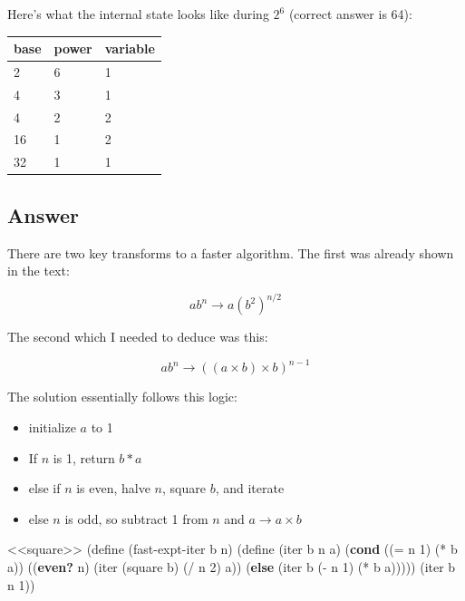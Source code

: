 \documentclass[
]{article}
\newenvironment{Shaded}{}{}
\newcommand{\DecValTok}[1]{\textcolor[rgb]{0.25,0.63,0.44}{#1}}
\newcommand{\ExtensionTok}[1]{#1}
\newcommand{\FunctionTok}[1]{\textcolor[rgb]{0.02,0.16,0.49}{#1}}
\newcommand{\KeywordTok}[1]{\textcolor[rgb]{0.00,0.44,0.13}{\textbf{#1}}}
\newcommand{\NormalTok}[1]{#1}
\newcommand{\OperatorTok}[1]{\textcolor[rgb]{0.40,0.40,0.40}{#1}}
\providecommand{\tightlist}{%
  \setlength{\itemsep}{0pt}\setlength{\parskip}{0pt}}
\begin{document}
Here's what the internal state looks like during \(2^6\) (correct answer
is 64):

\begin{longtable}[]{@{}lll@{}}
\toprule
base & power & variable \\
\midrule
\endhead
2 & 6 & 1 \\
4 & 3 & 1 \\
4 & 2 & 2 \\
16 & 1 & 2 \\
32 & 1 & 1 \\
\bottomrule
\end{longtable}

\hypertarget{answer-14}{%
\subsection{Answer}\label{answer-14}}

There are two key transforms to a faster algorithm. The first was
already shown in the text:

\[
    ab^n \to a(b^2)^{n/2}
\]

The second which I needed to deduce was this:

\[
    ab^n \to ((a \times b) \times b)^{n - 1}
\]

The solution essentially follows this logic:

\begin{itemize}
\tightlist
\item
  initialize \(a\) to 1
\item
  If \( n \) is 1, return \(b * a\)
\item
  else if \(n\) is even, halve \(n\), square \(b\), and iterate
\item
  else \(n\) is odd, so subtract 1 from \(n\) and \(a \to a \times b\)
\end{itemize}

\hypertarget{fast-expt-iter}{%
\label{fast-expt-iter}}%
\begin{Shaded}
\begin{Highlighting}[numbers=left,,]
\NormalTok{\textless{}\textless{}square\textgreater{}\textgreater{}}
\NormalTok{(}\ExtensionTok{define}\FunctionTok{ }\NormalTok{(fast{-}expt{-}iter b n)}
\NormalTok{  (}\ExtensionTok{define}\FunctionTok{ }\NormalTok{(iter b n a)}
\NormalTok{    (}\KeywordTok{cond}\NormalTok{ ((}\OperatorTok{=}\NormalTok{ n }\DecValTok{1}\NormalTok{) (}\OperatorTok{*}\NormalTok{ b a))}
\NormalTok{          ((}\KeywordTok{even?}\NormalTok{ n) (iter (square b)}
\NormalTok{                         (}\OperatorTok{/}\NormalTok{ n }\DecValTok{2}\NormalTok{)}
\NormalTok{                         a))}
\NormalTok{          (}\KeywordTok{else}\NormalTok{ (iter b (}\OperatorTok{{-}}\NormalTok{ n }\DecValTok{1}\NormalTok{) (}\OperatorTok{*}\NormalTok{ b a)))))}
\NormalTok{  (iter b n }\DecValTok{1}\NormalTok{))}
\end{Highlighting}
\end{Shaded}
\end{document}
